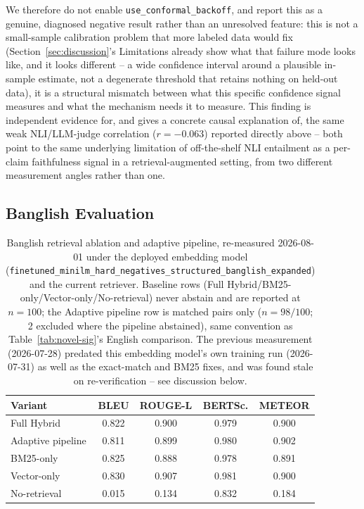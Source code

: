 \documentclass[a4paper,twoside]{article}
\begin{document}
We therefore do not enable \texttt{use\_conformal\_backoff}, and report this as a genuine, diagnosed negative result rather than an unresolved feature: this is not a small-sample calibration problem that more labeled data would fix (Section~\ref{sec:discussion}'s Limitations already show what that failure mode looks like, and it looks different -- a wide confidence interval around a plausible in-sample estimate, not a degenerate threshold that retains nothing on held-out data), it is a structural mismatch between what this specific confidence signal measures and what the mechanism needs it to measure. This finding is independent evidence for, and gives a concrete causal explanation of, the same weak NLI/LLM-judge correlation ($r=-0.063$) reported directly above -- both point to the same underlying limitation of off-the-shelf NLI entailment as a per-claim faithfulness signal in a retrieval-augmented setting, from two different measurement angles rather than one.

\subsection{Banglish Evaluation}
\label{subsec:banglish}

\begin{table}[t]
\caption{Banglish retrieval ablation and adaptive pipeline, re-measured 2026-08-01 under the deployed embedding model (\texttt{finetuned\_minilm\_hard\_negatives\_structured\_banglish\_expanded}) and the current retriever. Baseline rows (Full Hybrid/BM25-only/Vector-only/No-retrieval) never abstain and are reported at $n=100$; the Adaptive pipeline row is matched pairs only ($n=98/100$; 2 excluded where the pipeline abstained), same convention as Table~\ref{tab:novel-sig}'s English comparison. The previous measurement (2026-07-28) predated this embedding model's own training run (2026-07-31) as well as the exact-match and BM25 fixes, and was found stale on re-verification -- see discussion below.}\label{tab:banglish-ablation} \centering
\begin{tabular}{|l|c|c|c|c|}
\hline
Variant & BLEU & ROUGE-L & BERTSc. & METEOR \\
\hline
Full Hybrid & 0.822 & 0.900 & 0.979 & 0.900 \\
Adaptive pipeline & 0.811 & 0.899 & 0.980 & 0.902 \\
BM25-only & 0.825 & 0.888 & 0.978 & 0.891 \\
Vector-only & 0.830 & 0.907 & 0.981 & 0.900 \\
No-retrieval & 0.015 & 0.134 & 0.832 & 0.184 \\
\hline
\end{tabular}
\end{table}
\end{document}
